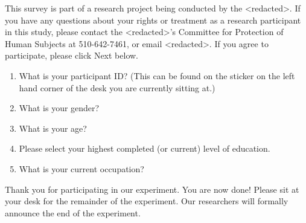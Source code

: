 \documentclass[USenglish,oneside,twocolumn]{article}
\begin{document}
This survey is part of a research project being conducted by the <redacted>. %
If you have any questions about your rights or treatment as a research participant in this study, please contact the <redacted>'s %
Committee for Protection of Human Subjects at 510-642-7461, or email 
<redacted>. %
If you agree to participate, please click Next below.\\

\begin{enumerate}
\item{What is your participant ID? (This can be found on the sticker on the left hand corner of the desk you are currently sitting at.)}
\item{What is your gender?}
\item{What is your age?}
\item{Please select your highest completed (or current) level of education}.
\item{What is your current occupation?}  
\end{enumerate}

Thank you for participating in our experiment. You are now done! Please sit at your desk for the remainder of the experiment. Our researchers will formally announce the end of the experiment. 
\end{document}
